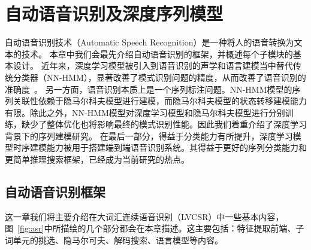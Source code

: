 
\chapter{自动语音识别及深度序列模型}
\label{chap:intro}

自动语音识别技术（Automatic Speech Recognition）是一种将人的语音转换为文本的技术。
本章中我们会最先介绍自动语音识别的框架，并概述每个子模块的基本设计。
近年来，深度学习模型被引入到语音识别的声学和语言建模当中替代传统分类器（NN-HMM），显著改善了模式识别问题的精度，从而改善了语音识别的准确度~\cite{CD-DNN-HMM-dahl2012,DNN4ASR-hinton2012}。 另一方面，语音识别本质上是一个序列标注问题。NN-HMM模型的序列关联性依赖于隐马尔科夫模型进行建模，而隐马尔科夫模型的状态转移建模能力有限。除此之外，NN-HMM模型对深度学习模型和隐马尔科夫模型进行分别训练，缺少了整体优化也将影响最终的模式识别性能。因此我们着重介绍了深度学习背景下的序列建模研究。
在最后一部分，得益于分类能力有所提升，深度学习模型时序建模能力被用于搭建端到端语音识别系统。其得益于更好的序列分类能力和更简单推理搜索框架，已经成为当前研究的热点。


\section{自动语音识别框架}
\label{chap:intro-asr}

这一章我们将主要介绍在大词汇连续语音识别（LVCSR）中一些基本内容，图~\ref{fig:asr}中所描绘的几个部分都会在本章描述。这主要包括：特征提取前端、子词单元的挑选、隐马尔可夫、解码搜索、语言模型等内容。

